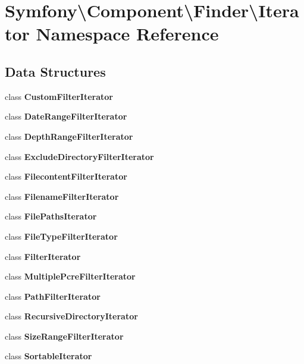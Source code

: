 \section{Symfony\textbackslash{}Component\textbackslash{}Finder\textbackslash{}Iterator Namespace Reference}
\label{namespace_symfony_1_1_component_1_1_finder_1_1_iterator}
\subsection*{Data Structures}
\begin{DoxyCompactItemize}
\item 
class {\bf Custom\+Filter\+Iterator}
\item 
class {\bf Date\+Range\+Filter\+Iterator}
\item 
class {\bf Depth\+Range\+Filter\+Iterator}
\item 
class {\bf Exclude\+Directory\+Filter\+Iterator}
\item 
class {\bf Filecontent\+Filter\+Iterator}
\item 
class {\bf Filename\+Filter\+Iterator}
\item 
class {\bf File\+Paths\+Iterator}
\item 
class {\bf File\+Type\+Filter\+Iterator}
\item 
class {\bf Filter\+Iterator}
\item 
class {\bf Multiple\+Pcre\+Filter\+Iterator}
\item 
class {\bf Path\+Filter\+Iterator}
\item 
class {\bf Recursive\+Directory\+Iterator}
\item 
class {\bf Size\+Range\+Filter\+Iterator}
\item 
class {\bf Sortable\+Iterator}
\end{DoxyCompactItemize}
